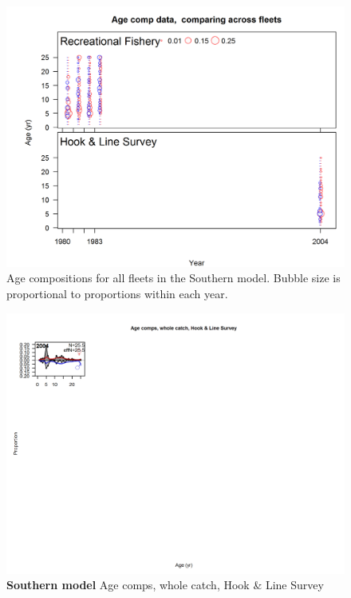 \documentclass[12pt,]{article}
\begin{document}
\begin{figure}[htbp]
\centering
\includegraphics{r4ss/plots_mod2/comp_agedat__multi-fleet_comparison.png}
\caption{Age compositions for all fleets in the Southern model. Bubble
size is proportional to proportions within each year.
\label{fig:comp_age_bubble_mod2}}
\end{figure}

\FloatBarrier

\newpage

\begin{figure}[htbp]
\centering
\includegraphics{./r4ss/plots_mod2/comp_agefit_flt4mkt0.png}
\caption{\textbf{Southern model} Age comps, whole catch, Hook \& Line
Survey \label{fig:mod2_1_comp_agefit_flt4mkt0}}
\end{figure}
\end{document}
